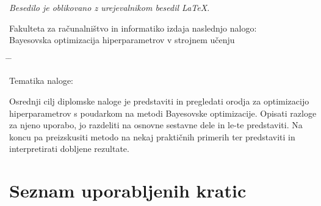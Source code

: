 \documentclass[a4paper, 12pt]{book}
\newcommand{\clearemptydoublepage}{\newpage{\pagestyle{empty}\cleardoublepage}}
\begin{document}
\begin{center}
\mbox{}\vfill
\emph{Besedilo je oblikovano z urejevalnikom besedil \LaTeX.}
\end{center}
\clearemptydoublepage

\thispagestyle{empty}
\vspace*{4cm}

\noindent
Fakulteta za računalništvo in informatiko izdaja naslednjo nalogo: \\
Bayesovska optimizacija hiperparametrov v strojnem učenju
\medskip
\begin{tabbing}
\hspace{32mm}\= \hspace{6cm} \= \kill




Tematika naloge:
\end{tabbing}
Osrednji cilj diplomske naloge je predstaviti in pregledati orodja za optimizacijo hiperparametrov s poudarkom na metodi Bayesovske optimizacije.
Opisati razloge za njeno uporabo, jo razdeliti na osnovne sestavne dele in le-te predstaviti.
Na koncu pa preizskusiti metodo na nekaj praktičnih primerih ter predstaviti in interpretirati dobljene rezultate.  
\vspace{15mm}






\vspace{2cm}

\clearemptydoublepage

\clearemptydoublepage

\thispagestyle{empty}\mbox{}{\textheight}\mbox{}\hfill\begin{minipage}{0.55\textwidth}%
\normalfont\end{minipage}

\pagestyle{empty}
\def\thepage{}%
\tableofcontents{}


\clearemptydoublepage


\chapter*{Seznam uporabljenih kratic}  %
\end{document}
